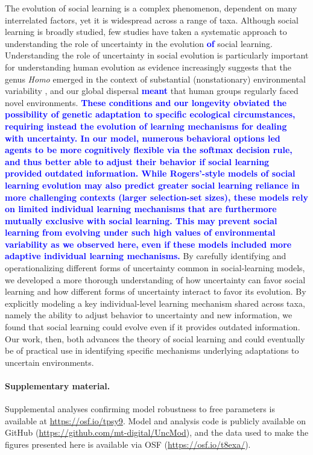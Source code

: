 \documentclass[letterpaper,11.5pt]{scrartcl}
\newcommand{\edit}[1]{{\bfseries \textcolor{blue} {#1}}}
\begin{document}
The evolution of social learning is a complex phenomenon, dependent on many interrelated factors, yet it is widespread across a
range of taxa. Although social learning is broadly studied, few studies have taken a systematic approach to understanding the role
of uncertainty in the evolution \edit{of} social learning. Understanding the role of uncertainty in social evolution is particularly important
for understanding human evolution as evidence increasingly suggests that the genus \emph{Homo} emerged in the context of substantial
(nonstationary) environmental variability \citep{anton_etal2014, levin2015}, and our global dispersal
\edit{meant} that human groups regularly faced novel environments. \edit{These
conditions and our longevity obviated the possibility of genetic
adaptation to specific ecological circumstances, requiring instead the evolution of
learning mechanisms for dealing with uncertainty. In our model, numerous behavioral
options led agents to be more cognitively flexible via the softmax decision rule, and
thus better able to adjust their behavior if social learning provided outdated
information. While Rogers'-style models of social learning evolution may also predict greater social learning reliance in more challenging contexts (larger selection-set sizes), these models rely on limited individual learning mechanisms that are furthermore mutually exclusive with social learning. This may prevent social learning from evolving under such high values of environmental variability as we observed here, even if these models included more adaptive individual learning mechanisms.} 
By carefully identifying and operationalizing different forms of uncertainty common in social-learning models, we developed a more thorough understanding of how uncertainty can favor social learning and how different forms of uncertainty interact to favor its evolution. By explicitly modeling a key individual-level learning mechanism shared across taxa, namely the ability to adjust behavior to uncertainty and new information, we found that social learning could evolve even if it provides outdated information. %
Our work, then, both advances the theory of social learning and could eventually be of practical use in identifying specific mechanisms underlying adaptations to uncertain environments.


\paragraph{Supplementary material.} Supplemental analyses confirming model robustness to free parameters is available at \url{https://osf.io/tpsy9}. Model and analysis code is publicly available on GitHub (\url{https://github.com/mt-digital/UncMod}), and the data used to make the figures presented here is available via OSF (\url{https://osf.io/t8exa/}).
\end{document}
